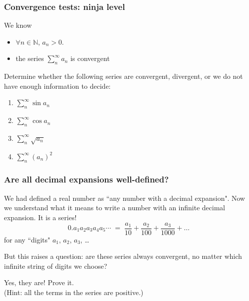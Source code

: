 \documentclass[14pt]{beamer}
\begin{document}
\begin{frame}[t]
	\frametitle{Convergence tests: ninja level}

	We know
	\begin{itemize}
		\item $\displaystyle \forall n \in \mathbb{N}$, $\displaystyle a_{n}> 0$.

		\item the series $\displaystyle \sum_{n}^{\infty}a_{n}$ is convergent
	\end{itemize}

	Determine whether the following series are convergent, divergent, or we do not
	have enough information to decide:
	\begin{multicols}{2}
		\begin{enumerate}
			\item $\displaystyle \sum_{n}^{\infty}\sin a_{n}$

			\item $\displaystyle \sum_{n}^{\infty}\cos a_{n}$

			\item $\displaystyle \sum_{n}^{\infty}\sqrt{a_{n}}$

			\item $\displaystyle \sum_{n}^{\infty}\left( a_{n}\right)^{2}$
		\end{enumerate}
	\end{multicols}
\end{frame}

\begin{frame}[t]
	\fontsize{13}{13}\selectfont
	\frametitle{Are all decimal expansions well-defined?}

	We had defined a real number as ``any number with a decimal expansion". Now we
	understand what it means to write a number with an infinite decimal expansion.
	It is a series!
	\[
		0.a_{1}a_{2}a_{3}a_{4}a_{5}\cdots \; = \; \frac{a_{1}}{10}+ \frac{a_{2}}{100}
		+ \frac{a_{3}}{1000}+ \ldots
	\]
	for any ``digits" $a_{1}$, $a_{2}$, $a_{3}$, \ldots

	But this raises a question: are these series always convergent, no matter
	which infinite string of digits we choose?

	Yes, they are! Prove it. \\ (Hint: all the terms in the series are positive.)
\end{frame}
\end{document}
